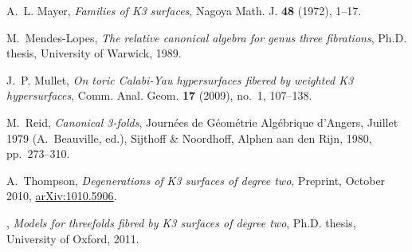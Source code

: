 \documentclass{amsart}
\begin{document}
\begin{thebibliography}{10}
A.~L. Mayer, \emph{Families of {K3} surfaces}, Nagoya Math. J. \textbf{48}
  (1972), 1--17.

M.~Mendes-Lopes, \emph{The relative canonical algebra for genus three
  fibrations}, Ph.D. thesis, University of Warwick, 1989.

J.~P. Mullet, \emph{On toric {C}alabi-{Y}au hypersurfaces fibered by weighted
  {K}3 hypersurfaces}, Comm. Anal. Geom. \textbf{17} (2009), no.~1, 107--138.

M.~Reid, \emph{Canonical 3-folds}, Journ\'{e}es de G\'{e}om\'{e}trie
  Alg\'{e}brique d'Angers, Juillet 1979 (A.~Beauville, ed.), Sijthoff \&
  Noordhoff, Alphen aan den Rijn, 1980, pp.~273--310.

A.~Thompson, \emph{Degenerations of {K3} surfaces of degree two}, Preprint,
  October 2010, \url{arXiv:1010.5906}.

\bysame, \emph{Models for threefolds fibred by {K3} surfaces of degree two},
  Ph.D. thesis, University of Oxford, 2011.
\end{thebibliography}
\end{document}
